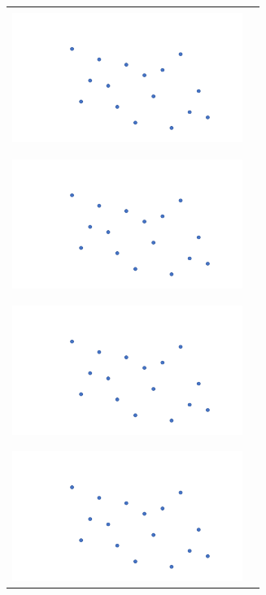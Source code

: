 \documentclass[a4paper,12pt]{article}
\begin{document}
\begin{center}
\begin{tabular}{|c|c|}
\hline
 & \\
\hspace{10pt}\includegraphics[width=7.5cm]{../images/spatial_subd.pdf}
\hspace{10pt} & \hspace{175pt} \\
 & \\
\hline
 & \\
\hspace{10pt}\includegraphics[width=7.5cm]{../images/spatial_subd.pdf}
\hspace{10pt} & \hspace{10pt} \\
 & \\
\hline
 & \\
\hspace{10pt}\includegraphics[width=7.5cm]{../images/spatial_subd.pdf}
\hspace{10pt} & \hspace{10pt} \\
 & \\
\hline
 & \\
\hspace{10pt}\includegraphics[width=7.5cm]{../images/spatial_subd.pdf}

\end{tabular}
\end{center}
\end{document}
